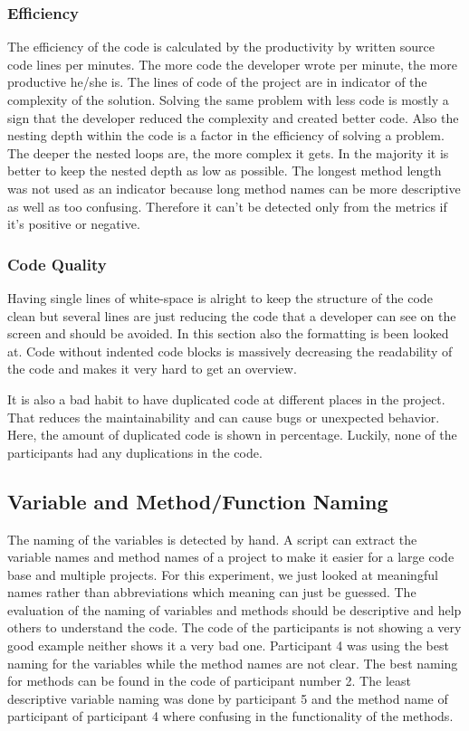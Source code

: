 \subsubsection{Efficiency}
The efficiency of the code is calculated by the productivity by written source code lines per minutes. The more code the developer wrote per minute, the more productive he/she is. 
The lines of code of the project are in indicator of the complexity of the solution. Solving the same problem with less code is mostly a sign that the developer reduced the complexity and created better code. 
Also the nesting depth within the code is a factor in the efficiency of solving a problem. The deeper the nested loops are, the more complex it gets. In the majority it is better to keep the nested depth as low as possible. 
The longest method length was not used as an indicator because long method names can be more descriptive as well as too confusing. Therefore it can't be detected only from the metrics if it's positive or negative. 

\subsubsection{Code Quality}
Having single lines of white-space is alright to keep the structure of the code clean but several lines are just reducing the code that a developer can see on the screen and should be avoided. 
In this section also the formatting is been looked at. Code without indented code blocks is massively decreasing the readability of the code and makes it very hard to get an overview. 

It is also a bad habit to have duplicated code at different places in the project. That reduces the maintainability and can cause bugs or unexpected behavior. Here, the amount of duplicated code is shown in percentage. Luckily, none of the participants had any duplications in the code. 

\subsection{Variable and Method/Function Naming}
The naming of the variables is detected by hand. A script can extract the variable names and method names of a project to make it easier for a large code base and multiple projects. For this experiment, we just looked at meaningful names rather than abbreviations which meaning can just be guessed. 
The evaluation of the naming of variables and methods should be descriptive and help others to understand the code. The code of the participants is not showing a very good example neither shows it a very bad one. Participant 4 was using the best naming for the variables while the method names are not clear. The best naming for methods can be found in the code of participant number 2. 
The least descriptive variable naming was done by participant 5 and the method name of participant of participant 4 where confusing in the functionality of the methods.

